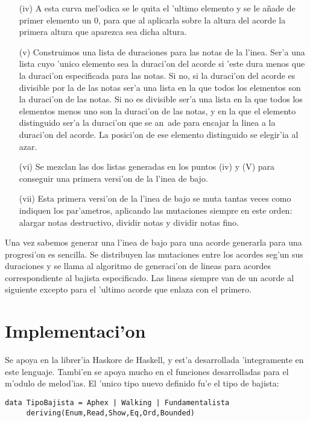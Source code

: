 \begin{enumerate}
\begin{enumerate}
		\item[(iv)] A esta curva mel'odica se le quita el 'ultimo elemento y se le añade de primer elemento un 0, para que al aplicarla sobre la altura del acorde la primera altura que aparezca sea dicha altura.
		\item[(v)] Construimos una lista de duraciones para las notas de la l'inea. Ser'a una lista cuyo 'unico elemento sea la duraci'on del acorde si 'este dura menos que la duraci'on especificada para las notas. Si no, si la duraci'on del acorde es divisible por la de las notas ser'a una lista en la que todos los elementos son la duraci'on de las notas. Si no es divisible ser'a una lista en la que todos los elementos menos uno son la duraci'on de las notas, y en la que el elemento distinguido ser'a la duraci'on que se an~ade para encajar la linea a la duraci'on del acorde. La posici'on de ese elemento distinguido se elegir'ia al azar.
 		\item[(vi)] Se mezclan las dos listas generadas en los puntos (iv) y (V) para conseguir una primera versi'on de la l'inea de bajo.
		\item[(vii)] Esta primera versi'on de la l'inea de bajo se muta tantas veces como indiquen los par'ametros, aplicando las mutaciones siempre en este orden: alargar notas destructivo,  dividir notas y dividir notas fino.
		\end{enumerate}
	\end{enumerate}
Una vez sabemos generar una l'inea de bajo para una acorde generarla para una progresi'on es sencilla. Se distribuyen las mutaciones entre los acordes seg'un sus duraciones y se llama al algoritmo de generaci'on de lineas para acordes correspondiente al bajista especificado. Las lineas siempre van de un acorde al siguiente excepto para el 'ultimo acorde que enlaza con el primero.

\section{Implementaci'on}
Se apoya en la librer'ia Haskore de Haskell, y est'a desarrollada 'integramente en este lenguaje. Tambi'en se apoya mucho en el funciones desarrolladas para el m'odulo de melod'ias.
\newline\newline
El 'unico tipo nuevo definido fu'e el tipo de bajista:
	\begin{verbatim}
data TipoBajista = Aphex | Walking | Fundamentalista
     deriving(Enum,Read,Show,Eq,Ord,Bounded)
	\end{verbatim}

